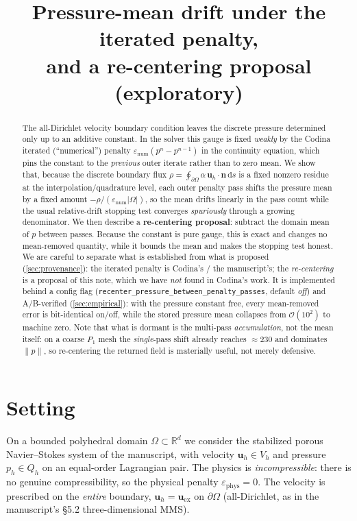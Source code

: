 \documentclass[11pt]{article}
\title{Pressure-mean drift under the iterated penalty,\\[2pt]
and a re-centering proposal (exploratory)}
\author{}
\date{}
\theoremstyle{plain}
\theoremstyle{remark}
\newcommand{\bu}{\boldsymbol{u}}
\newcommand{\bn}{\boldsymbol{n}}
\newcommand{\uh}{\boldsymbol{u}_h}
\newcommand{\ph}{p_h}
\newcommand{\Om}{\Omega}
\newcommand{\dOm}{\partial\Omega}
\newcommand{\meas}{\lvert\Omega\rvert}
\newcommand{\enum}{\varepsilon_{\mathrm{num}}}
\newcommand{\ephys}{\varepsilon_{\mathrm{phys}}}
\newcommand{\norm}[1]{\lVert #1\rVert}
\newcommand{\ds}{\,\mathrm{d}s}
\begin{document}
\maketitle

\begin{abstract}
The all-Dirichlet velocity boundary condition leaves the discrete pressure determined only up to an
additive constant. In the solver this gauge is fixed \emph{weakly} by the Codina iterated
(``numerical'') penalty $\enum(p^{n}-p^{n-1})$ in the continuity equation, which pins the constant to
the \emph{previous} outer iterate rather than to zero mean. We show that, because the discrete boundary
flux $\rho=\oint_{\dOm}\alpha\,\uh\cdot\bn\ds$ is a fixed nonzero residue at the interpolation/quadrature
level, each outer penalty pass shifts the pressure mean by a fixed amount
$-\rho/(\enum\meas)$, so the mean drifts linearly in the pass count while the usual relative-drift
stopping test converges \emph{spuriously} through a growing denominator. We then describe a
\textbf{re-centering proposal}: subtract the domain mean of $p$ between passes. Because the constant is
pure gauge, this is exact and changes no mean-removed quantity, while it bounds the mean and makes the
stopping test honest. We are careful to separate what is established from what is proposed
(\cref{sec:provenance}): the iterated penalty is Codina's / the manuscript's; the \emph{re-centering}
is a proposal of this note, which we have \emph{not} found in Codina's work. It is implemented behind a
config flag (\texttt{recenter\_pressure\_between\_penalty\_passes}, default \emph{off}) and A/B-verified
(\cref{sec:empirical}): with the pressure constant free, every mean-removed error is bit-identical
on/off, while the stored pressure mean collapses from $\mathcal{O}(10^{2})$ to machine zero. Note that
what is dormant is the multi-pass \emph{accumulation}, not the mean itself: on a coarse $P_1$ mesh the
\emph{single}-pass shift already reaches $\approx 230$ and dominates $\norm{p}$, so re-centering the
returned field is materially useful, not merely defensive.
\end{abstract}

\section{Setting}
\label{sec:setting}

On a bounded polyhedral domain $\Om\subset\mathbb{R}^{d}$ we consider the stabilized porous
Navier--Stokes system of the manuscript, with velocity $\uh\in V_h$ and pressure $\ph\in Q_h$ on an
equal-order Lagrangian pair. The physics is \emph{incompressible}: there is no genuine compressibility,
so the physical penalty $\ephys=0$. The velocity is prescribed on the \emph{entire} boundary,
$\uh=\bu_{\mathrm{ex}}$ on $\dOm$ (all-Dirichlet, as in the manuscript's \S5.2 three-dimensional MMS).
\end{document}
